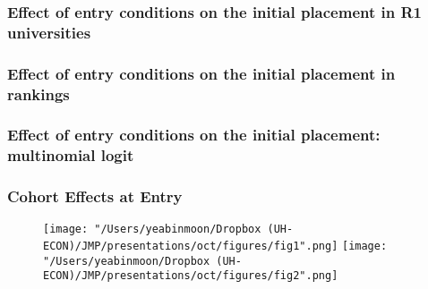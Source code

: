 \documentclass[11pt]{beamer}
\begin{document}
{
	\begin{frame}
		\frametitle{Effect of entry conditions on the initial placement in R1 universities}
		
	\end{frame}
}

{
	\begin{frame}
		\frametitle{Effect of entry conditions on the initial placement in rankings}
		
	\end{frame}
}

{
	\begin{frame}
		\frametitle{Effect of entry conditions on the initial placement: multinomial logit}
		
	\end{frame}
}

\begin{frame}
	\frametitle{Cohort Effects at Entry}
	
	\begin{figure}
		\centering
		\texttt{[image: "/Users/yeabinmoon/Dropbox (UH-ECON)/JMP/presentations/oct/figures/fig1".png]} 
		\texttt{[image: "/Users/yeabinmoon/Dropbox (UH-ECON)/JMP/presentations/oct/figures/fig2".png]} 
	\end{figure}
	
\end{frame}
\end{document}
